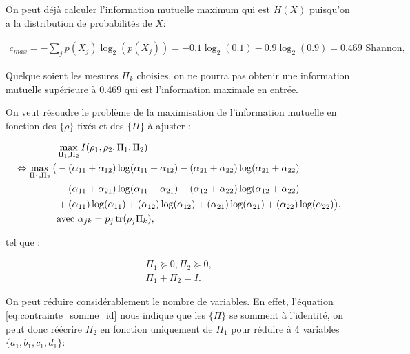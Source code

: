 On peut déjà calculer l'information mutuelle maximum qui est $H(X)$ \cite{Cover91} puisqu'on a la distribution de probabilités de $X$: 

\begin{align}
    c_{max} = \displaystyle -\sum_j p(X_j) \log_2(p(X_j)) = -0.1\log_2(0.1) - 0.9 \log_2(0.9) = 0.469 \text{ Shannon},
\end{align}

Quelque soient les mesures $\Pi_k$ choisies, on ne pourra pas obtenir une information mutuelle supérieure à $0.469$ qui est l'information maximale en entrée.

On veut résoudre le problème de la maximisation de l'information mutuelle en fonction des $\{\rho\}$ fixés et des $\{\Pi\}$ à ajuster : 

\begin{align}
    &\max\limits_{\Pi_1, \Pi_2} I(\rho_1, \rho_2, \Pi_1, \Pi_2) \\
% 
\Leftrightarrow \max\limits_{\Pi_1, \Pi_2} \big(&-(\alpha_{11} + \alpha_{12})\log(\alpha_{11} + \alpha_{12}) - (\alpha_{21} + \alpha_{22})\log(\alpha_{21} + \alpha_{22}) \nonumber \\
        &- (\alpha_{11} + \alpha_{21})\log(\alpha_{11} + \alpha_{21}) - (\alpha_{12} + \alpha_{22})\log(\alpha_{12} + \alpha_{22}) \nonumber \\
        &+ (\alpha_{11})\log(\alpha_{11}) + (\alpha_{12})\log(\alpha_{12}) + (\alpha_{21})\log(\alpha_{21}) + (\alpha_{22})\log(\alpha_{22}) \big),\nonumber\\
        & \text{avec } \alpha_{jk} = p_j\tr(\rho_j  \Pi_k) ,\nonumber
\end{align}

tel que :

\begin{align}
    \Pi_1 \succeq 0, \Pi_2 \succeq 0,\\
    \Pi_1 + \Pi_2 = I.
\end{align}

On peut réduire considérablement le nombre de variables. En effet, l'équation \ref{eq:contrainte_somme_id} nous indique que les $\{\Pi\}$ se somment à l'identité, on peut donc réécrire $\Pi_2$ en fonction uniquement de $\Pi_1$ pour réduire à 4 variables $\{a_1, b_1, c_1, d_1\}$:

